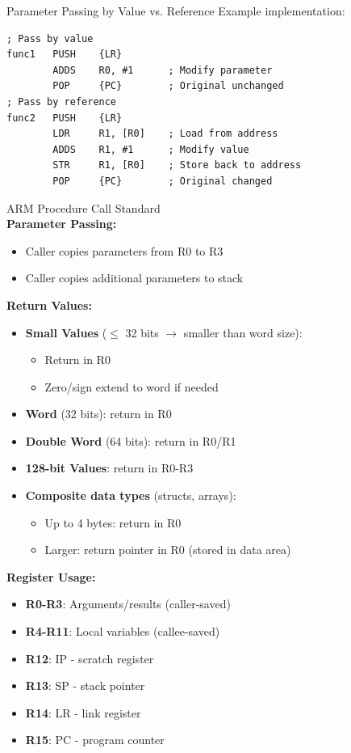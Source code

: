\begin{KR}{Parameter Passing by Value vs. Reference}
Example implementation:
\begin{lstlisting}[language=armasm, style=basesmol]
; Pass by value
func1   PUSH    {LR}
        ADDS    R0, #1      ; Modify parameter
        POP     {PC}        ; Original unchanged
; Pass by reference
func2   PUSH    {LR}
        LDR     R1, [R0]    ; Load from address
        ADDS    R1, #1      ; Modify value
        STR     R1, [R0]    ; Store back to address
        POP     {PC}        ; Original changed
\end{lstlisting}
\end{KR}


\begin{definition}{ARM Procedure Call Standard}\\
\textbf{Parameter Passing:}
\begin{itemize}
  \item Caller copies parameters from R0 to R3
  \item Caller copies additional parameters to stack
\end{itemize}

\textbf{Return Values:}
\begin{itemize}
  \item \textbf{Small Values} ($\leq$ 32 bits $\rightarrow$ smaller than word size): 
    \begin{itemize}
      \item Return in R0
      \item Zero/sign extend to word if needed
    \end{itemize}
  \item \textbf{Word} (32 bits): return in R0
  \item \textbf{Double Word} (64 bits): return in R0/R1
  \item \textbf{128-bit Values}: return in R0-R3
  \item \textbf{Composite data types} (structs, arrays): 
    \begin{itemize}
      \item Up to 4 bytes: return in R0
      \item Larger: return pointer in R0 (stored in data area)
    \end{itemize}
\end{itemize}

\textbf{Register Usage:}
\begin{itemize}
  \item \textbf{R0-R3}: Arguments/results (caller-saved)
  \item \textbf{R4-R11}: Local variables (callee-saved)
  \item \textbf{R12}: IP - scratch register
  \item \textbf{R13}: SP - stack pointer
  \item \textbf{R14}: LR - link register
  \item \textbf{R15}: PC - program counter
\end{itemize}


\end{definition}
